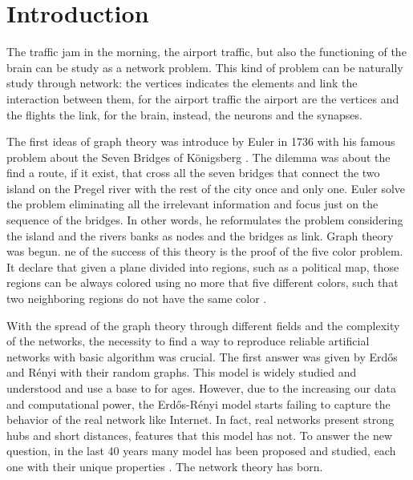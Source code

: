 \chapter*{Introduction}

The traffic jam in the morning, the airport traffic, but also the functioning of the brain can be study as a network problem. 
This kind of problem can be naturally study through network: the vertices indicates the elements and link the interaction between them, for the airport traffic the airport are the vertices and the flights the link, for the brain, instead, the neurons and the synapses. 

The first ideas of graph theory was introduce by Euler in 1736 with his famous problem about the Seven Bridges of Königsberg \cite{Euler}. The dilemma was about the find a route, if it exist, that cross all the seven bridges that connect the two island on the Pregel river with the rest of the city once and only one.  Euler solve the problem eliminating all the irrelevant information and focus just on the sequence of the bridges. In other words, he reformulates the problem considering the island and the rivers banks as nodes and the bridges as link.
Graph theory was begun. ne of the success of this theory is the proof of the five color problem. It declare that given a plane divided into regions, such as a political map, those regions can be always colored using no more that five different colors, such that two neighboring regions do not have the same color \cite{Heawood_color_theorem,Ringel_Color_Theorem}.

With the spread of the graph theory through different fields and the complexity of the networks, the necessity to find a way to reproduce reliable  artificial networks with basic algorithm was crucial. The first answer was given by Erd\H{o}s and Rényi \cite{erdos-renyi1960} with their random graphs. This model is widely studied and understood and use a base to for ages. 
However, due to the increasing our data and computational power, the Erd\H{o}s-Rényi model starts failing to capture the behavior of the real network like Internet. In fact, real networks present strong hubs and short distances, features that this model has not. 
To answer the new question, in the last 40 years many model has been proposed and studied, each one with their unique properties \cite{Barabasi_Albert_1999,Watts-Strogatz_1998}. The network theory has born. 

